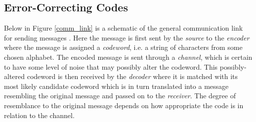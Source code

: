 \documentclass[conference]{IEEEtran}
\theoremstyle{definition}
\begin{document}
\subsection{Error-Correcting Codes}
Below in Figure \ref{comm_link} is a schematic of the general
communication link for sending messages \cite{clanton2005maa}.
Here the message is first sent by the \emph{source} to the
\emph{encoder} where the message is assigned a \emph{codeword},
i.e. a string of characters from some chosen alphabet.  The
encoded message is sent through a \emph{channel}, which is
certain to have some level of noise that may possibly alter
the codeword.  This possibly-altered codeword is then received
by the \emph{decoder} where it is matched with its most likely
candidate codeword which is in turn translated into a message
resembling the original message and passed on to the \emph{receiver}.
The degree of resemblance to the original message depends
on how appropriate the code is in relation to the channel.\\
\end{document}
